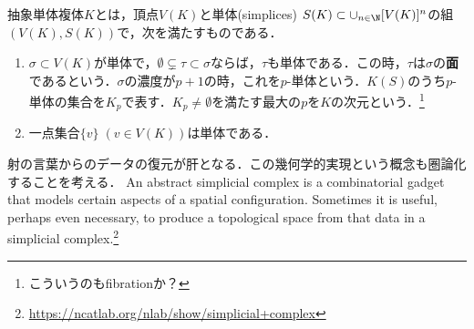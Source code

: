 \documentclass[uplatex,dvipdfmx]{jsreport}
\begin{document}
\begin{definition}
    抽象単体複体$K$とは，頂点$V(K)$と単体(simplices) $S(K)\subset\cup_{n\in\N}[V(K)]^n$の組$(V(K),S(K))$で，次を満たすものである．
    \begin{enumerate}
        \item $\sigma\subset V(K)$が単体で，$\emptyset\subsetneq\tau\subset\sigma$ならば，$\tau$も単体である．この時，$\tau$は$\sigma$の\textbf{面}であるという．$\sigma$の濃度が$p+1$の時，これを$p$-単体という．$K(S)$のうち$p$-単体の集合を$K_p$で表す．$K_p\ne\emptyset$を満たす最大の$p$を$K$の次元という．\footnote{こういうのもfibrationか？}
        \item 一点集合$\{v\}\;(v\in V(K))$は単体である．
    \end{enumerate}
\end{definition}
\begin{remarks}
    射の言葉からのデータの復元が肝となる．この幾何学的実現という概念も圏論化することを考える．
    An abstract simplicial complex is a combinatorial gadget that models certain aspects of a spatial configuration. Sometimes it is useful, perhaps even necessary, to produce a topological space from that data in a simplicial complex.\footnote{\url{https://ncatlab.org/nlab/show/simplicial+complex}}
\end{remarks}
\end{document}
